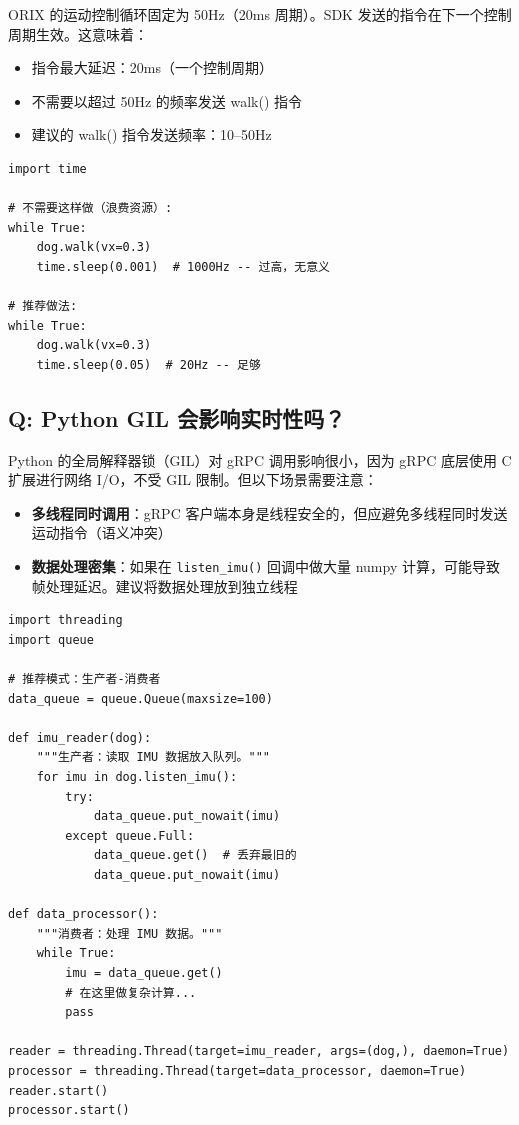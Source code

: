 \documentclass[a4paper,11pt,openany]{book}
\begin{document}
ORIX 的运动控制循环固定为 50Hz（20ms 周期）。SDK 发送的指令在下一个控制周期生效。这意味着：
\begin{itemize}[nosep]
  \item 指令最大延迟：20ms（一个控制周期）
  \item 不需要以超过 50Hz 的频率发送 walk() 指令
  \item 建议的 walk() 指令发送频率：10--50Hz
\end{itemize}

\begin{lstlisting}[style=python]
import time

# 不需要这样做（浪费资源）:
while True:
    dog.walk(vx=0.3)
    time.sleep(0.001)  # 1000Hz -- 过高，无意义

# 推荐做法:
while True:
    dog.walk(vx=0.3)
    time.sleep(0.05)  # 20Hz -- 足够
\end{lstlisting}

\subsection{Q: Python GIL 会影响实时性吗？}

Python 的全局解释器锁（GIL）对 gRPC 调用影响很小，因为 gRPC 底层使用 C 扩展进行网络 I/O，不受 GIL 限制。但以下场景需要注意：

\begin{itemize}[nosep]
  \item \textbf{多线程同时调用}：gRPC 客户端本身是线程安全的，但应避免多线程同时发送运动指令（语义冲突）
  \item \textbf{数据处理密集}：如果在 \texttt{listen\_imu()} 回调中做大量 numpy 计算，可能导致帧处理延迟。建议将数据处理放到独立线程
\end{itemize}

\begin{lstlisting}[style=python]
import threading
import queue

# 推荐模式：生产者-消费者
data_queue = queue.Queue(maxsize=100)

def imu_reader(dog):
    """生产者：读取 IMU 数据放入队列。"""
    for imu in dog.listen_imu():
        try:
            data_queue.put_nowait(imu)
        except queue.Full:
            data_queue.get()  # 丢弃最旧的
            data_queue.put_nowait(imu)

def data_processor():
    """消费者：处理 IMU 数据。"""
    while True:
        imu = data_queue.get()
        # 在这里做复杂计算...
        pass

reader = threading.Thread(target=imu_reader, args=(dog,), daemon=True)
processor = threading.Thread(target=data_processor, daemon=True)
reader.start()
processor.start()
\end{lstlisting}
\end{document}
